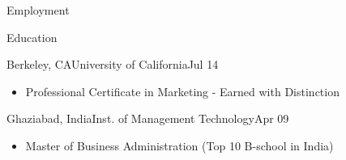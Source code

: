 \documentclass[]{mcdowellcv}
\begin{document}
\begin{cvsection}{Employment}
	\end{cvsection}
	
	\begin{cvsection}{Education}
		\begin{cvsubsection}{Berkeley, CA}{University of California}{Jul 14}
			\begin{itemize}
				\item Professional Certificate in Marketing - Earned with Distinction
			\end{itemize}
		\end{cvsubsection}
		\begin{cvsubsection}{Ghaziabad, India}{Inst. of Management Technology}{Apr 09}
			\begin{itemize}
				\item Master of Business Administration (Top 10 B-school in India)
			\end{itemize}
		\end{cvsubsection}
	\end{cvsection}
	
\end{document}

